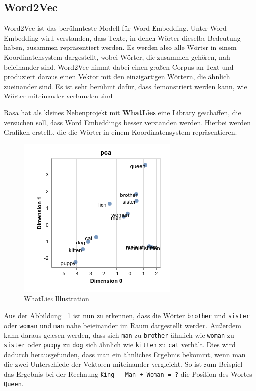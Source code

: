 \subsection{Word2Vec}\label{subsec:word2vec}

Word2Vec ist das berühmteste Modell für Word Embedding.
Unter Word Embedding wird verstanden, dass Texte, in denen Wörter dieselbe Bedeutung haben, zusammen repräsentiert werden.
Es werden also alle Wörter in einem Koordinatensystem dargestellt, wobei Wörter, die zusammen gehören, nah beieinander sind.
Word2Vec nimmt dabei einen großen Corpus an Text und produziert daraus einen Vektor mit den einzigartigen Wörtern, die ähnlich zueinander sind.
Es ist sehr berühmt dafür, dass demonstriert werden kann, wie Wörter miteinander verbunden sind.

Rasa hat als kleines Nebenprojekt mit \textbf{WhatLies} eine Library geschaffen, die versuchen soll, dass Word Embeddings besser verstanden werden.
Hierbei werden Grafiken erstellt, die die Wörter in einem Koordinatensystem repräsentieren.\cite{whatlies}

\begin{figure}[hbt!]
    \centering
    \includegraphics[scale=1]{pics/whatlies_demo}
    \caption{WhatLies Illustration~\cite{whatlies}}
    \label{fig:whatLies-demo}
\end{figure}

Aus der Abbildung ~\ref{fig:whatLies-demo} ist nun zu erkennen, dass die Wörter \texttt{brother} und \texttt{sister} oder \texttt{woman} und \texttt{man} nahe beieinander im Raum dargestellt werden.
Außerdem kann daraus gelesen werden, dass sich \texttt{man} zu \texttt{brother} ähnlich wie \texttt{woman} zu \texttt{sister} oder \texttt{puppy} zu \texttt{dog} sich ähnlich wie \texttt{kitten} zu \texttt{cat} verhält.
Dies wird dadurch herausgefunden, dass man ein ähnliches Ergebnis bekommt, wenn man die zwei Unterschiede der Vektoren miteinander vergleicht.
So ist zum Beispiel das Ergebnis bei der Rechnung \texttt{King - Man + Woman = ?} die Position des Wortes \texttt{Queen}.

